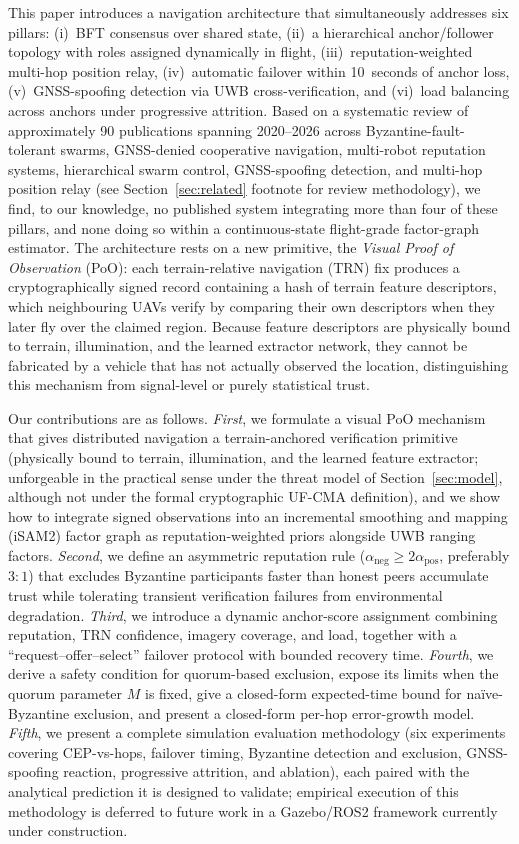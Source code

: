 \documentclass[conference,10pt]{IEEEtran}
\begin{document}
This paper introduces a navigation architecture that simultaneously addresses six pillars: (i)~BFT consensus over shared state, (ii)~a hierarchical anchor/follower topology with roles assigned dynamically in flight, (iii)~reputation-weighted multi-hop position relay, (iv)~automatic failover within 10~seconds of anchor loss, (v)~GNSS-spoofing detection via UWB cross-verification, and (vi)~load balancing across anchors under progressive attrition. Based on a systematic review of approximately 90 publications spanning 2020--2026 across Byzantine-fault-tolerant swarms, GNSS-denied cooperative navigation, multi-robot reputation systems, hierarchical swarm control, GNSS-spoofing detection, and multi-hop position relay (see Section~\ref{sec:related} footnote for review methodology), we find, to our knowledge, no published system integrating more than four of these pillars, and none doing so within a continuous-state flight-grade factor-graph estimator. The architecture rests on a new primitive, the \emph{Visual Proof of Observation} (PoO): each terrain-relative navigation (TRN) fix produces a cryptographically signed record containing a hash of terrain feature descriptors, which neighbouring UAVs verify by comparing their own descriptors when they later fly over the claimed region. Because feature descriptors are physically bound to terrain, illumination, and the learned extractor network, they cannot be fabricated by a vehicle that has not actually observed the location, distinguishing this mechanism from signal-level or purely statistical trust.

Our contributions are as follows. \emph{First}, we formulate a visual PoO mechanism that gives distributed navigation a terrain-anchored verification primitive (physically bound to terrain, illumination, and the learned feature extractor; unforgeable in the practical sense under the threat model of Section~\ref{sec:model}, although not under the formal cryptographic UF-CMA definition), and we show how to integrate signed observations into an incremental smoothing and mapping (iSAM2) factor graph as reputation-weighted priors alongside UWB ranging factors. \emph{Second}, we define an asymmetric reputation rule ($\alpha_\text{neg}\!\geq\!2\alpha_\text{pos}$, preferably $3{:}1$) that excludes Byzantine participants faster than honest peers accumulate trust while tolerating transient verification failures from environmental degradation. \emph{Third}, we introduce a dynamic anchor-score assignment combining reputation, TRN confidence, imagery coverage, and load, together with a ``request--offer--select'' failover protocol with bounded recovery time. \emph{Fourth}, we derive a safety condition for quorum-based exclusion, expose its limits when the quorum parameter $M$ is fixed, give a closed-form expected-time bound for na\"ive-Byzantine exclusion, and present a closed-form per-hop error-growth model. \emph{Fifth}, we present a complete simulation evaluation methodology (six experiments covering CEP-vs-hops, failover timing, Byzantine detection and exclusion, GNSS-spoofing reaction, progressive attrition, and ablation), each paired with the analytical prediction it is designed to validate; empirical execution of this methodology is deferred to future work in a Gazebo/ROS2 framework currently under construction.
\end{document}
